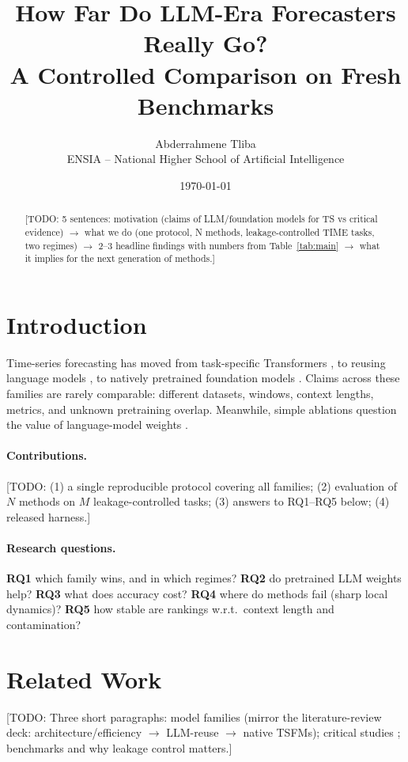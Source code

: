 \documentclass[11pt]{article}
\title{How Far Do LLM-Era Forecasters Really Go?\\A Controlled Comparison on Fresh Benchmarks}
\author{Abderrahmene Tliba \quad \todo{co-authors / supervisor}\\ ENSIA -- National Higher School of Artificial Intelligence}
\date{\today}
\newcommand{\todo}[1]{{\color{red}[TODO: #1]}}
\begin{document}
\maketitle
\begin{abstract}
\todo{5 sentences: motivation (claims of LLM/foundation models for TS vs critical evidence) $\rightarrow$ what we do (one protocol, N methods, leakage-controlled TIME tasks, two regimes) $\rightarrow$ 2--3 headline findings with numbers from Table~\ref{tab:main} $\rightarrow$ what it implies for the next generation of methods.}
\end{abstract}

\section{Introduction}
Time-series forecasting has moved from task-specific Transformers \citep{zhou2021informer,wu2021autoformer,zhou2022fedformer,nie2023patchtst}, to reusing language models \citep{gruver2023llmtime,zhou2023gpt4ts,jin2024timellm}, to natively pretrained foundation models \citep{ansari2024chronos,das2024timesfm,woo2024moirai,goswami2024moment,liu2025sundial}. Claims across these families are rarely comparable: different datasets, windows, context lengths, metrics, and unknown pretraining overlap. Meanwhile, simple ablations question the value of language-model weights \citep{tan2024language}.
\paragraph{Contributions.} \todo{(1) a single reproducible protocol covering all families; (2) evaluation of $N$ methods on $M$ leakage-controlled tasks; (3) answers to RQ1--RQ5 below; (4) released harness.}

\paragraph{Research questions.}
\textbf{RQ1} which family wins, and in which regimes? \textbf{RQ2} do pretrained LLM weights help? \textbf{RQ3} what does accuracy cost? \textbf{RQ4} where do methods fail (sharp local dynamics)? \textbf{RQ5} how stable are rankings w.r.t.\ context length and contamination?

\section{Related Work}
\todo{Three short paragraphs: model families (mirror the literature-review deck: architecture/efficiency $\rightarrow$ LLM-reuse $\rightarrow$ native TSFMs); critical studies \citep{tan2024language}; benchmarks \citep{aksu2024gifteval,shchur2025fevbench,qiao2026time} and why leakage control matters.}
\end{document}
